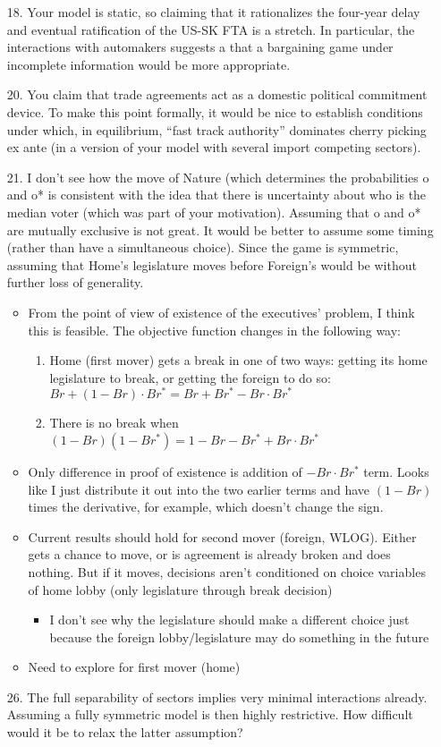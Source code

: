 \documentclass[12pt]{article}
\begin{document}
\begin{enumerate}
	\item[18.] Your model is static, so claiming that it rationalizes the four-year delay and eventual ratification of the US-SK FTA is a stretch. In particular, the interactions with automakers suggests a that a bargaining game under incomplete information would be more appropriate.
  \item[20.] You claim that trade agreements act as a domestic political commitment device. To make this point formally, it would be nice to establish conditions under which, in equilibrium, “fast track authority” dominates cherry picking ex ante (in a version of your model with several import competing sectors).
	\item[21.] I don’t see how the move of Nature (which determines the probabilities o and o* is consistent with the idea that there is uncertainty about who is the median voter (which was part of your motivation). Assuming that o and o* are mutually exclusive is not great. It would be better to assume some timing (rather than have a simultaneous choice). Since the game is symmetric, assuming that Home’s legislature moves before Foreign’s would be without further loss of generality.
		\begin{itemize}
			\item From the point of view of existence of the executives' problem, I think this is feasible. The objective function changes in the following way:
				\begin{enumerate}
					\item Home (first mover) gets a break in one of two ways: getting its home legislature to break, or getting the foreign to do so: $Br + (1-Br)\cdot Br^* = Br + Br^* - Br \cdot Br^*$
					\item There is no break when $(1-Br)(1-Br^*) = 1 - Br - Br^* + Br \cdot Br^*$
				\end{enumerate}
			\item Only difference in proof of existence is addition of $- Br \cdot Br^*$ term. Looks like I just distribute it out into the two earlier terms and have $(1 - Br)$ times the derivative, for example, which doesn't change the sign.
			\item Current results should hold for second mover (foreign, WLOG). Either gets a chance to move, or is agreement is already broken and does nothing. But if it moves, decisions aren't conditioned on choice variables of home lobby (only legislature through break decision)
				\begin{itemize}
					\item I don't see why the legislature should make a different choice just because the foreign lobby/legislature may do something in the future
				\end{itemize}
			\item Need to explore for first mover (home)
		\end{itemize}
	\item[26.] The full separability of sectors implies very minimal interactions already. Assuming a fully symmetric model is then highly restrictive. How difficult would it be to relax the latter assumption?
\end{enumerate}
\end{document}
